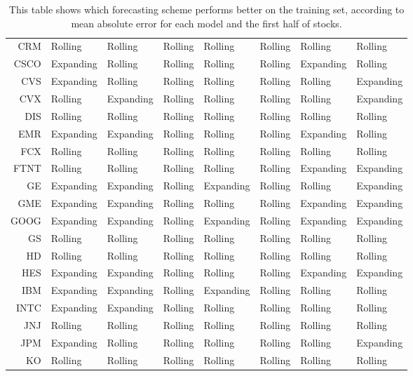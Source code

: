 \begin{table}[ht]
\begin{tabular}{rlllllll}
  CRM & Rolling & Rolling & Rolling & Rolling & Rolling & Rolling & Rolling \\ 
  CSCO & Expanding & Rolling & Rolling & Rolling & Rolling & Expanding & Rolling \\ 
  CVS & Expanding & Rolling & Rolling & Rolling & Rolling & Rolling & Expanding \\ 
  CVX & Rolling & Expanding & Rolling & Rolling & Rolling & Rolling & Expanding \\ 
  DIS & Rolling & Rolling & Rolling & Rolling & Rolling & Rolling & Rolling \\ 
  EMR & Expanding & Expanding & Rolling & Rolling & Rolling & Expanding & Rolling \\ 
  FCX & Rolling & Rolling & Rolling & Rolling & Rolling & Rolling & Rolling \\ 
  FTNT & Rolling & Rolling & Rolling & Rolling & Rolling & Expanding & Expanding \\ 
  GE & Expanding & Expanding & Rolling & Expanding & Rolling & Rolling & Expanding \\ 
  GME & Expanding & Expanding & Rolling & Rolling & Rolling & Expanding & Expanding \\ 
  GOOG & Expanding & Expanding & Rolling & Expanding & Rolling & Expanding & Expanding \\ 
  GS & Rolling & Rolling & Rolling & Rolling & Rolling & Rolling & Rolling \\ 
  HD & Rolling & Rolling & Rolling & Rolling & Rolling & Rolling & Rolling \\ 
  HES & Expanding & Expanding & Rolling & Rolling & Rolling & Expanding & Expanding \\ 
  IBM & Expanding & Expanding & Rolling & Expanding & Rolling & Rolling & Rolling \\ 
  INTC & Expanding & Expanding & Rolling & Rolling & Rolling & Rolling & Rolling \\ 
  JNJ & Rolling & Rolling & Rolling & Rolling & Rolling & Rolling & Rolling \\ 
  JPM & Expanding & Rolling & Rolling & Rolling & Rolling & Rolling & Expanding \\ 
  KO & Rolling & Rolling & Rolling & Rolling & Rolling & Rolling & Rolling \\ 
   \hline
\end{tabular}
\caption[Better scheme MAE (1)]{This table shows which forecasting scheme performs better on the training set, according to mean absolute error 
              for each model and the first half of stocks.} 
\label{Table:Better_MAE_1}
\end{table}
